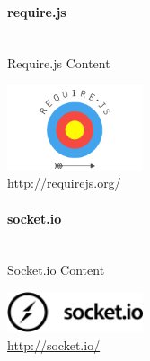\documentclass[a4paper]{spie}  %
\begin{document}
\begin{figure}[H]
\begin{minipage}[t]{0.4\textwidth}
\vspace{0pt}
\paragraph{require.js}\mbox{}\\
Require.js Content
\end{minipage}
\hfill
\begin{minipage}[t]{0.5\textwidth}
\vspace{0pt}
		\includegraphics[width=4cm, right]{./images/software/req_js_logo}
		\caption{\url{http://requirejs.org/}}
		\label{fig:test2}
\end{minipage}
\end{figure}


\begin{figure}[H]
\begin{minipage}[t]{0.4\textwidth}
\vspace{0pt}
\paragraph{socket.io}\mbox{}\\
Socket.io Content
\end{minipage}
\hfill
\begin{minipage}[t]{0.5\textwidth}
\vspace{0pt}
		\includegraphics[width=4cm, right]{./images/software/socket-io}
		\caption{\url{http://socket.io/}}
		\label{fig:test2}
\end{minipage}
\end{figure}
\end{document}
